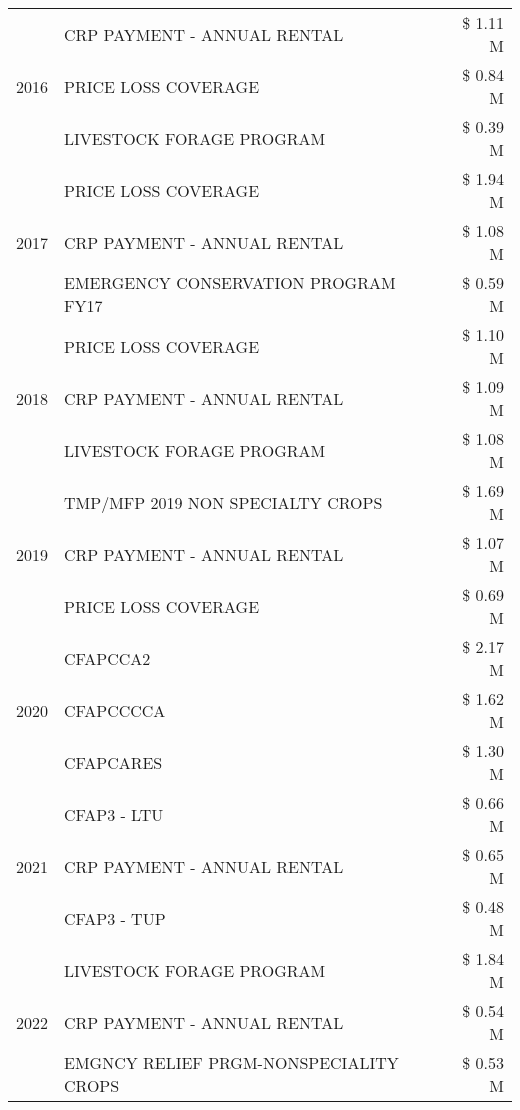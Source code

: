 \begin{tabular}{llr}
\cline{1-3}
\multirow[t]{3}{*}{2016} & CRP PAYMENT - ANNUAL RENTAL & \$ 1.11 M \\
 & PRICE LOSS COVERAGE & \$ 0.84 M \\
 & LIVESTOCK FORAGE PROGRAM & \$ 0.39 M \\
\cline{1-3}
\multirow[t]{3}{*}{2017} & PRICE LOSS COVERAGE & \$ 1.94 M \\
 & CRP PAYMENT - ANNUAL RENTAL & \$ 1.08 M \\
 & EMERGENCY CONSERVATION PROGRAM FY17 & \$ 0.59 M \\
\cline{1-3}
\multirow[t]{3}{*}{2018} & PRICE LOSS COVERAGE & \$ 1.10 M \\
 & CRP PAYMENT - ANNUAL RENTAL & \$ 1.09 M \\
 & LIVESTOCK FORAGE PROGRAM & \$ 1.08 M \\
\cline{1-3}
\multirow[t]{3}{*}{2019} & TMP/MFP 2019 NON SPECIALTY CROPS & \$ 1.69 M \\
 & CRP PAYMENT - ANNUAL RENTAL & \$ 1.07 M \\
 & PRICE LOSS COVERAGE & \$ 0.69 M \\
\cline{1-3}
\multirow[t]{3}{*}{2020} & CFAPCCA2 & \$ 2.17 M \\
 & CFAPCCCCA & \$ 1.62 M \\
 & CFAPCARES & \$ 1.30 M \\
\cline{1-3}
\multirow[t]{3}{*}{2021} & CFAP3 - LTU & \$ 0.66 M \\
 & CRP PAYMENT - ANNUAL RENTAL & \$ 0.65 M \\
 & CFAP3 - TUP & \$ 0.48 M \\
\cline{1-3}
\multirow[t]{3}{*}{2022} & LIVESTOCK FORAGE PROGRAM & \$ 1.84 M \\
 & CRP PAYMENT - ANNUAL RENTAL & \$ 0.54 M \\
 & EMGNCY RELIEF PRGM-NONSPECIALITY CROPS & \$ 0.53 M \\
\cline{1-3}
\bottomrule
\end{tabular}
